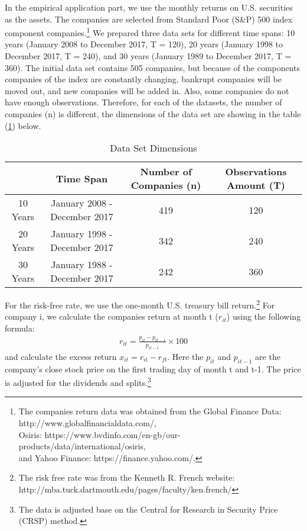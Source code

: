 In the empirical application part, we use the monthly returns on U.S. securities as the assets.
The companies are selected from Standard Poor (S\&P) 500 index component companies.\footnote{The companies return data was obtained from the Global Finance Data: http://www.globalfinancialdata.com/,\\ Osiris: https://www.bvdinfo.com/en-gb/our-products/data/international/osiris, \\and Yahoo Finance: https://finance.yahoo.com/.}
We prepared three data sets for different time spans: 10 years (January 2008 to December 2017, T = 120), 20 years (January 1998 to December 2017, T  = 240), and 30 years (January 1989 to December 2017, T = 360).
The initial data set contains 505 companies, but because of the components companies of the index are constantly changing, bankrupt companies will be moved out, and new companies will be added in.
Also, some companies do not have enough observations.
Therefore, for each of the datasets, the number of companies (n) is different, the dimensions of the data set are showing in the table (\ref{Data_set}) below.

\begin{table}[h]
		\caption{Data Set Dimensions}
			\label{Data_set}
	\begin{tabular}{c|ccc}
		\hline
		& Time Span                    & Number of Companies (n) & Observations Amount (T) \\ \hline
		10 Years & January 2008 - December 2017 & 419                  & 120                     \\
		20 Years & January 1998 - December 2017 & 342                  & 240                     \\
		30 Years & January 1988 - December 2017 & 242                  & 360                     \\ \hline
	\end{tabular}
\end{table}
For the risk-free rate, we use the one-month U.S. treasury bill return.\footnote{ The risk free rate was from the Kenneth R. French website: http://mba.tuck.dartmouth.edu/pages/faculty/ken.french/}
For company i, we calculate the companies return at month t ($r_{it}$) using the following formula:
\begin{align*}
r_{it} = \frac{p_{i t} - p_{i t-1}}{p_{i t-1}}\times 100
\end{align*}
and calculate the excess return $x_{it} = r_{it} - r_{ft}$.
Here the $p_{it}$ and $p_{i t-1}$ are the company's close stock price on the first trading day of month t and t-1.
The price is adjusted for the dividends and splits.\footnote{The data is adjusted base on the Central for Research in Security Price (CRSP) method.}

